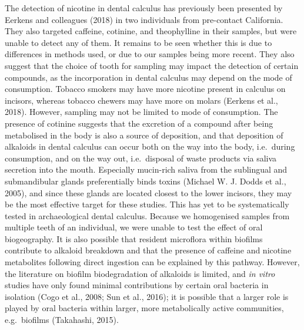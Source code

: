 \documentclass[
  letterpaper,
]{book}
\begin{document}
The detection of nicotine in dental calculus has previously been
presented by Eerkens and colleagues (2018) in two individuals from
pre-contact California. They also targeted caffeine, cotinine, and
theophylline in their samples, but were unable to detect any of them. It
remains to be seen whether this is due to differences in methods used,
or due to our samples being more recent. They also suggest that the
choice of tooth for sampling may impact the detection of certain
compounds, as the incorporation in dental calculus may depend on the
mode of consumption. Tobacco smokers may have more nicotine present in
calculus on incisors, whereas tobacco chewers may have more on molars
(Eerkens et al., 2018). However, sampling may not be limited to mode of
consumption. The presence of cotinine suggests that the excretion of a
compound after being metabolised in the body is also a source of
deposition, and that deposition of alkaloids in dental calculus can
occur both on the way into the body, i.e.~during consumption, and on the
way out, i.e.~disposal of waste products via saliva secretion into the
mouth. Especially mucin-rich saliva from the sublingual and
submandibular glands preferentially binds toxins (Michael W. J. Dodds et
al., 2005), and since these glands are located closest to the lower
incisors, they may be the most effective target for these studies. This
has yet to be systematically tested in archaeological dental calculus.
Because we homogenised samples from multiple teeth of an individual, we
were unable to test the effect of oral biogeography. It is also possible
that resident microflora within biofilms contribute to alkaloid
breakdown and that the presence of caffeine and nicotine metabolites
following direct ingestion can be explained by this pathway. However,
the literature on biofilm biodegradation of alkaloids is limited, and
\emph{in vitro} studies have only found minimal contributions by certain
oral bacteria in isolation (Cogo et al., 2008; Sun et al., 2016); it is
possible that a larger role is played by oral bacteria within larger,
more metabolically active communities, e.g.~biofilms (Takahashi, 2015).
\end{document}
